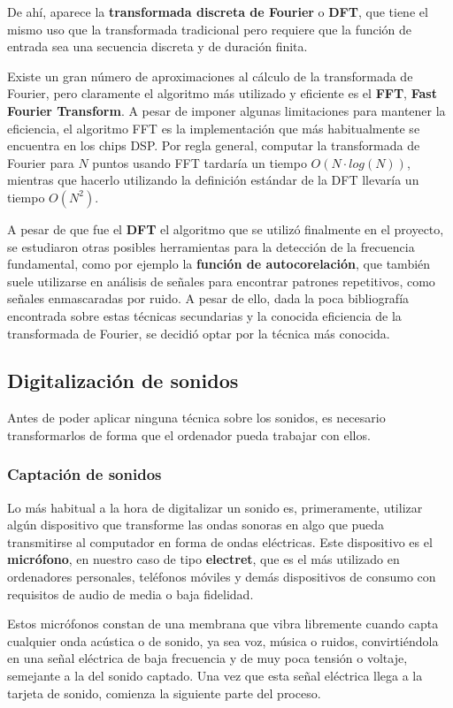 De ahí, aparece la \textbf{transformada discreta de Fourier} o \textbf{DFT}, que
tiene el mismo uso que la transformada tradicional pero requiere que la función
de entrada sea una secuencia discreta y de duración finita.

Existe un gran número de aproximaciones al cálculo de la transformada de
Fourier, pero claramente el algoritmo más utilizado y eficiente es el
\textbf{FFT}, \textbf{Fast Fourier Transform}. A pesar de imponer algunas
limitaciones para mantener la eficiencia, el algoritmo FFT es la implementación
que más habitualmente se encuentra en los chips DSP. Por regla general, computar
la transformada de Fourier para $N$ puntos usando FFT tardaría un tiempo $O(N
\cdot log(N))$, mientras que hacerlo utilizando la definición estándar de la DFT
llevaría un tiempo $O(N^2)$.

A pesar de que fue el \textbf{DFT} el algoritmo que se utilizó finalmente en el
proyecto, se estudiaron otras posibles herramientas para la detección de la
frecuencia fundamental, como por ejemplo la \textbf{función de autocorelación},
que también suele utilizarse en análisis de señales para encontrar patrones
repetitivos, como señales enmascaradas por ruido. A pesar de ello, dada la poca
bibliografía encontrada sobre estas técnicas secundarias y la conocida
eficiencia de la transformada de Fourier, se decidió optar por la técnica más
conocida.

\subsection{Digitalización de sonidos}

Antes de poder aplicar ninguna técnica sobre los sonidos, es necesario
transformarlos de forma que el ordenador pueda trabajar con ellos.

\subsubsection{Captación de sonidos}
Lo más habitual a la hora de digitalizar un sonido es, primeramente, utilizar
algún dispositivo que transforme las ondas sonoras en algo que pueda
transmitirse al computador en forma de ondas eléctricas. Este dispositivo es el
\textbf{micrófono}, en nuestro caso de tipo \textbf{electret}, que es el más
utilizado en ordenadores personales, teléfonos móviles y demás dispositivos de
consumo con requisitos de audio de media o baja fidelidad.

Estos micrófonos constan de una membrana que vibra libremente cuando capta
cualquier onda acústica o de sonido, ya sea voz, música o ruidos, convirtiéndola
en una señal eléctrica de baja frecuencia y de muy poca tensión o voltaje,
semejante a la del sonido captado. Una vez que esta señal eléctrica llega a la
tarjeta de sonido, comienza la siguiente parte del proceso.

